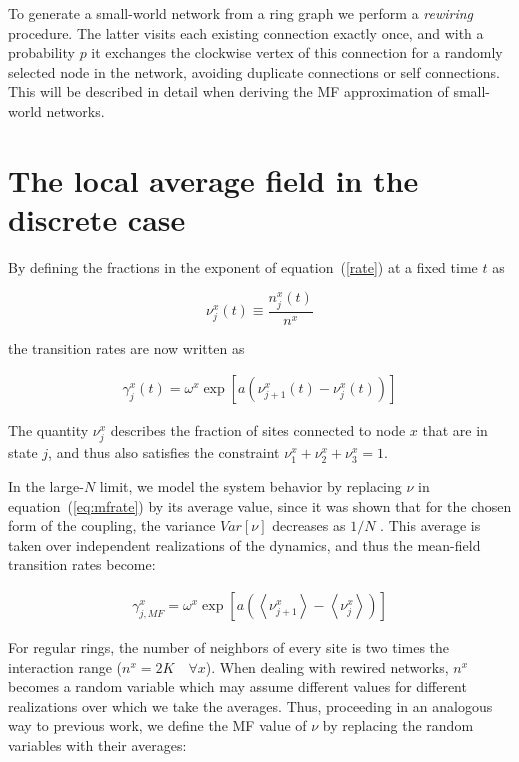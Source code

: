 To generate a small-world network from a ring graph we perform a \textit{rewiring} procedure. The latter visits each existing
connection exactly once, and with a probability $p$ it exchanges the clockwise vertex of this connection for a randomly selected node
in the network, avoiding duplicate connections or self connections. This will be described in detail when deriving the MF approximation
of small-world networks.

\section{The local average field in the discrete case}

By defining the fractions in the exponent of equation~(\ref{rate}) at a fixed time $t$ as

\begin{equation}
    \nu^x_j(t) \equiv \frac{n^x_j(t)}{n^x}
\end{equation}

\noindent the transition rates are now written as

\begin{align}
    \gamma^x_j(t) = \omega^x\exp\left[ a(\nu^x_{j+1}(t) - \nu^x_j(t)) \right]
    \label{eq:mfrate}
\end{align}

The quantity $\nu^x_j$ describes the fraction of sites connected to node $x$ that are in state $j$, and thus also satisfies the
constraint $\nu^x_1+\nu^x_2+\nu^x_3=1$.

In the large-$N$ limit, we model the system behavior by replacing $\nu$ in equation~(\ref{eq:mfrate}) by its average value, since it
was shown that for the chosen form of the coupling, the variance $Var[\nu]$ decreases as $1/N$ \cite{escaff2014arrays}. This average is
taken over independent realizations of the dynamics, and thus the mean-field transition rates become:

\begin{align}
    \gamma^x_{j,MF} = \omega^x \exp \left[ a \left( \left< \nu^x_{j+1} \right> - \left< \nu^x_j \right> \right) \right]
    \label{gammaMF}
\end{align}

For regular rings, the number of neighbors of every site is two times the interaction range ($n^x = 2K \quad \forall x$). When dealing
with rewired networks, $n^x$ becomes a random variable which may assume different values for different realizations over which we take
the averages. Thus, proceeding in an analogous way to previous work, we define the MF value of $\nu$ by replacing the random variables
with their averages:

